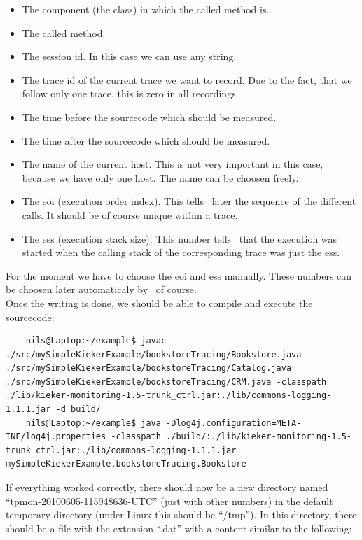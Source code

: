       \begin{itemize}
	\item The component (the class) in which the called method is.
	\item The called method.
	\item The session id. In this case we can use any string.
	\item The trace id of the current trace we want to record. Due to the fact, that we follow only one trace, this is zero in all recordings.
	\item The time before the sourcecode which should be measured.
	\item The time after the sourcecode which should be measured.
	\item The name of the current host. This is not very important in this case, because we have only one host. The name can be choosen freely.
	\item The eoi (execution order index). This tells \Kieker\ later the sequence of the different calls. It should be of course unique within a trace.
	\item The ess (execution stack size). This number tells \Kieker\ that the execution was started when the calling stack of the corresponding trace was just the                
              ess.
      \end{itemize}
      For the moment we have to choose the eoi and ess manually. These numbers can be choosen later automaticaly by \Kieker\ of course.\\
      Once the writing is done, we should be able to compile and execute the sourcecode:
      \setBashListing
      \begin{lstlisting}
	nils@Laptop:~/example$ javac ./src/mySimpleKiekerExample/bookstoreTracing/Bookstore.java ./src/mySimpleKiekerExample/bookstoreTracing/Catalog.java ./src/mySimpleKiekerExample/bookstoreTracing/CRM.java -classpath ./lib/kieker-monitoring-1.5-trunk_ctrl.jar:./lib/commons-logging-1.1.1.jar -d build/
	nils@Laptop:~/example$ java -Dlog4j.configuration=META-INF/log4j.properties -classpath ./build/:./lib/kieker-monitoring-1.5-trunk_ctrl.jar:./lib/commons-logging-1.1.1.jar mySimpleKiekerExample.bookstoreTracing.Bookstore
      \end{lstlisting}
      If everything worked correctly, there should now be a new directory named ``tpmon-20100605-115948636-UTC'' (just with other numbers) in the default temporary directory (under Linux this should be ``/tmp''). In this directory, there should be a file with the extension ``.dat'' with a content similar to the following:
